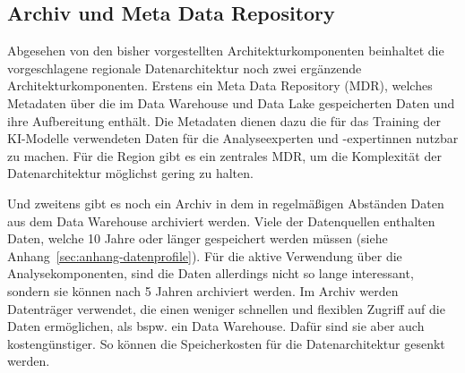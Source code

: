 \subsection{Archiv und Meta Data Repository}

Abgesehen von den bisher vorgestellten Architekturkomponenten
beinhaltet die vorgeschlagene regionale Datenarchitektur
noch zwei ergänzende Architekturkomponenten.
Erstens ein Meta Data Repository (MDR),
welches Metadaten über die im Data Warehouse und Data Lake
gespeicherten Daten und ihre Aufbereitung enthält.
Die Metadaten dienen dazu die für das Training der KI-Modelle
verwendeten Daten für die Analyseexperten und -expertinnen nutzbar zu machen.
Für die Region gibt es ein zentrales MDR, um die Komplexität
der Datenarchitektur möglichst gering zu halten.

Und zweitens gibt es noch ein Archiv in dem in regelmäßigen
Abständen Daten aus dem Data Warehouse archiviert werden.
Viele der Datenquellen enthalten Daten, 
welche 10 Jahre oder länger gespeichert werden müssen 
(siehe Anhang~\ref{sec:anhang-datenprofile}).
Für die aktive Verwendung über die Analysekomponenten,
sind die Daten allerdings nicht so lange interessant,
sondern sie können nach 5 Jahren archiviert werden.
Im Archiv werden Datenträger verwendet, 
die einen weniger schnellen und flexiblen Zugriff auf die Daten
ermöglichen, als bspw. ein Data Warehouse. 
Dafür sind sie aber auch kostengünstiger.
So können die Speicherkosten für die Datenarchitektur
gesenkt werden.
